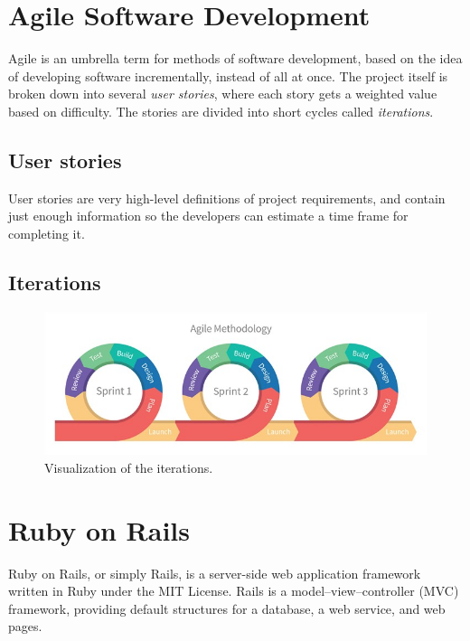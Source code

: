     
\section{Agile Software Development} \label{Agile}
\vspace{-5mm}
Agile is an umbrella term for methods of software development, based on the idea of developing software incrementally, instead of all at once. The project itself is broken down into several \textit{user stories}, where each story gets a weighted value based on difficulty. The stories are divided into short cycles called \textit{iterations}.\cite{agile:nutshell}

\subsection{User stories}
User stories are very high-level definitions of project requirements, and contain just enough information so the developers can estimate a time frame for completing it.



\subsection{Iterations}
\begin{figure}[H]
	\centering
	\includegraphics[trim={0 0 0 0},clip,width=1\textwidth]{Files/agile.jpg}
	\caption{Visualization of the iterations\cite{agile:figure}.}
	\label{fig: MVC}
\end{figure}

\section{Ruby on Rails} 
\vspace{-5mm}
Ruby on Rails, or simply Rails, is a server-side web application framework written in Ruby under the MIT License. Rails is a model–view–controller (MVC) framework, providing default structures for a database, a web service, and web pages. \cite{wiki:RoR}

